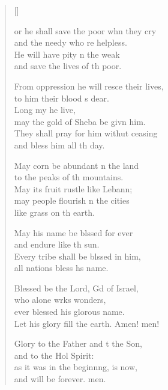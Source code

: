 \settowidth{\versewidth}{From oppression he will rescue their lives, *}
\begin{verse}[\versewidth]
  \begin{patverse}
or he shall save the poor whn they cry\Med\\
and the needy who re helpless.\\
He will have pity n the weak\Med\\
and save the lives of th poor.

From oppression he will resce their lives,\Med\\
to him their blood \pointup{\i}s dear.\\
Long my he live,\Med\\
may the gold of Sheba be givn him.\\
They shall pray for him withut ceasing\Med\\
and bless him all th day.

May corn be abundant \pointup{\i}n the land\Med\\
to the peaks of th mountains.\\
May its fruit rustle like Lebann;\Flex\\
may people flourish \pointup{\i}n the cities\Med\\
like grass on th earth.

May his name be blssed for ever\Med\\
and endure like th sun.\\
Every tribe shall be blssed in him,\Med\\
all nations bless h\pointup{\i}s name.

Blessed be the Lord, Gd of Israel,\Med\\
who alone wrks wonders,\\
ever blessed his glor\pointup{\i}ous name.\Med\\
Let his glory fill the earth. Amen! men!

Glory to the Father and t the Son,\Med\\
and to the Hol Spirit:\\
as it was in the beginn\pointup{\i}ng, is now,\Med\\
and will be forever. men.
  \end{patverse}
\end{verse}
